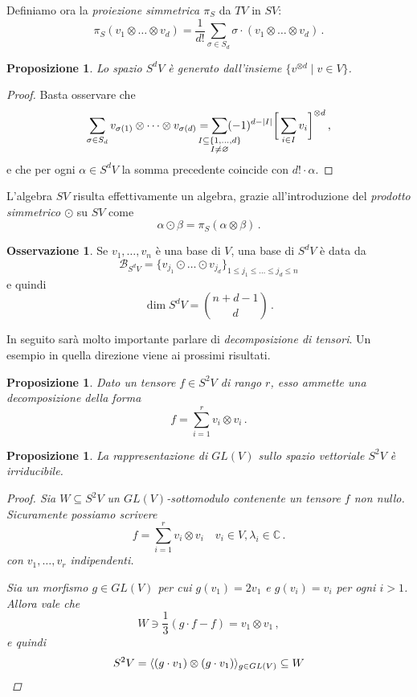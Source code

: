 \documentclass[a4paper, 11pt]{article}
\theoremstyle{definition}
\newtheorem*{Oss}{Osservazione}
\theoremstyle{plain}
\newtheorem{Prop}[Def]{Proposizione}
\DeclarePairedDelimiter{\ang}{\langle}{\rangle}
\DeclarePairedDelimiter{\abs}{\lvert}{\rvert}
\newcommand{\eset}{\varnothing}
\newcommand{\C}{\mathbb{C}}
\begin{document}
Definiamo ora la \emph{proiezione simmetrica $\pi_S$} da $TV$ in $SV$:
\[
	\pi_S(v_1 \otimes\dots\otimes v_d) = \frac{1}{d!}\sum_{\sigma \in S_d}\sigma \cdot (v_1\otimes\dots\otimes v_d)\,.
\]
\begin{Prop}
	Lo spazio $S^dV$ è generato dall'insieme $\{v^{\otimes d} \mid v \in V\}$.
\end{Prop}
\begin{proof}
	Basta osservare che 
	\[
		\sum_{\sigma \in S_d} v_{\sigma(1)}\otimes \dots \otimes v_{\sigma(d)} = \sum_{\mathclap{\substack{I \subseteq \{1,\dots, d\}\\I \neq \eset}
		}} (-1)^{d -\abs{I}} \bigg[\sum_{i \in I}v_i\bigg]^{\otimes d}\,,
	\]
	e che per ogni $\alpha \in S^dV$ la somma precedente coincide con $d!\cdot \alpha$.
\end{proof}

L'algebra $SV$ risulta effettivamente un algebra, grazie all'introduzione del \emph{prodotto simmetrico $\odot$} su $SV$ come
\[
	\alpha \odot \beta = \pi_S(\alpha\otimes\beta)	\,.
\]

\begin{Oss}
	Se $v_1, \dots, v_n$ è una base di $V$, una base di $S^dV$ è data da
	\[
		\mathcal{B}_{S^dV} = \{v_{j_1}\odot\dots\odot v_{j_d}\}_{1\le j_1 \le \dots \le j_d\le n}
	\]
	e quindi
	\[
		\dim S^dV = \binom{n+d-1}{d}\,.
	\]
\end{Oss}

In seguito sarà molto importante parlare di \emph{decomposizione di tensori}. Un esempio in quella direzione viene ai prossimi risultati.
\begin{Prop}
	Dato un tensore $f \in S^2V$ di rango $r$, esso ammette una decomposizione della forma
	\[
		f = \sum_{i=1}^r v_i \otimes v_i\,.
	\]
\end{Prop}
\begin{Prop}
	La rappresentazione di $GL(V)$ sullo spazio vettoriale $S^2V$ è irriducibile.
	\begin{proof}
		Sia $W \subseteq S^2V$ un $GL(V)$-sottomodulo contenente un tensore $f$ non nullo. Sicuramente possiamo scrivere
		\[
			f = \sum_{i=1}^rv_i \otimes v_i \quad v_i \in V, \lambda_i \in \C\,.
		\]
		con $v_1,\dots, v_r$ indipendenti.
		
		Sia un morfismo $g \in GL(V)$ per cui $g(v_1) = 2v_1$ e $g(v_i) = v_i$ per ogni $i > 1$. Allora vale che 
		\[
			W \ni \frac{1}{3}(g \cdot f - f) = v_1\otimes v_1\,,
		\]
		e quindi 
		\[
			S^2V = \ang{(g\cdot v_1) \otimes (g\cdot v_1)}_{g \in GL(V)} \subseteq W\qedhere
		\]
	\end{proof}
\end{Prop}
\end{document}
